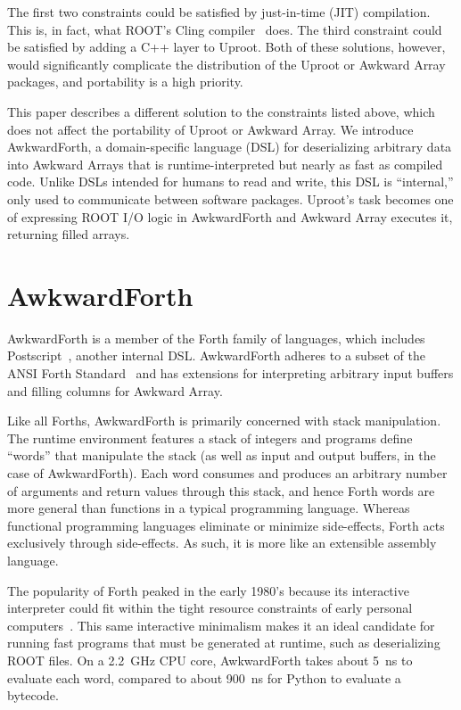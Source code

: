 \documentclass{webofc}
\begin{document}
The first two constraints could be satisfied by just-in-time (JIT) compilation. This is, in fact, what ROOT's Cling compiler~\cite{cling} does. The third constraint could be satisfied by adding a C++ layer to Uproot. Both of these solutions, however, would significantly complicate the distribution of the Uproot or Awkward Array packages, and portability is a high priority.

This paper describes a different solution to the constraints listed above, which does not affect the portability of Uproot or Awkward Array. We introduce AwkwardForth, a domain-specific language (DSL) for deserializing arbitrary data into Awkward Arrays that is runtime-interpreted but nearly as fast as compiled code. Unlike DSLs intended for humans to read and write, this DSL is ``internal,'' only used to communicate between software packages. Uproot's task becomes one of expressing ROOT I/O logic in AwkwardForth and Awkward Array executes it, returning filled arrays.

\section{AwkwardForth}

AwkwardForth is a member of the Forth family of languages, which includes Postscript~\cite{postscript}, another internal DSL. AwkwardForth adheres to a subset of the ANSI Forth Standard~\cite{forth-standard} and has extensions for interpreting arbitrary input buffers and filling columns for Awkward Array.

Like all Forths, AwkwardForth is primarily concerned with stack manipulation. The runtime environment features a stack of integers and programs define ``words'' that manipulate the stack (as well as input and output buffers, in the case of AwkwardForth). Each word consumes and produces an arbitrary number of arguments and return values through this stack, and hence Forth words are more general than functions in a typical programming language. Whereas functional programming languages eliminate or minimize side-effects, Forth acts exclusively through side-effects. As such, it is more like an extensible assembly language.

The popularity of Forth peaked in the early 1980's because its interactive interpreter could fit within the tight resource constraints of early personal computers~\cite{forth}. This same interactive minimalism makes it an ideal candidate for running fast programs that must be generated at runtime, such as deserializing ROOT files. On a 2.2~GHz CPU core, AwkwardForth takes about 5~ns to evaluate each word, compared to about 900~ns for Python to evaluate a bytecode.
\end{document}
